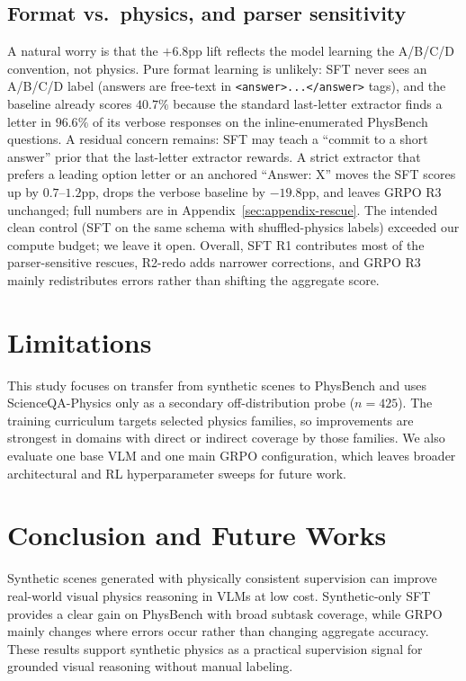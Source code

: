 \documentclass{article}
\begin{document}
\subsection{Format vs.\ physics, and parser sensitivity}
\label{sec:rescue}

A natural worry is that the $+6.8$pp lift reflects the model
learning the A/B/C/D convention, not physics. Pure format learning
is unlikely: SFT never sees an A/B/C/D label (answers are free-text
in \texttt{<answer>...</answer>} tags), and the baseline already
scores $40.7\%$ because the standard last-letter extractor finds a
letter in $96.6\%$ of its verbose responses on the inline-enumerated
PhysBench questions. A residual concern remains: SFT may teach a
``commit to a short answer'' prior that the last-letter extractor
rewards. A strict
extractor that prefers a leading option letter or an anchored
``Answer: X'' moves the SFT scores up by $0.7$--$1.2$pp, drops
the verbose baseline by $-19.8$pp, and leaves GRPO R3 unchanged;
full numbers are in Appendix~\ref{sec:appendix-rescue}. The
intended clean control (SFT on the same schema with
shuffled-physics labels) exceeded our compute budget; we leave
it open. Overall, SFT R1 contributes most of the parser-sensitive
rescues, R2-redo adds narrower corrections, and GRPO R3 mainly
redistributes errors rather than shifting the aggregate score.

\section{Limitations}
\label{sec:limitations}

This study focuses on transfer from synthetic scenes to PhysBench and
uses ScienceQA-Physics only as a secondary off-distribution probe
($n{=}425$). The training curriculum targets selected physics families,
so improvements are strongest in domains with direct or indirect
coverage by those families. We also evaluate one base VLM and one main
GRPO configuration, which leaves broader architectural and RL
hyperparameter sweeps for future work.

\section{Conclusion and Future Works}
\label{sec:conclusion}

Synthetic scenes generated with physically consistent supervision can
improve real-world visual physics reasoning in VLMs at low cost.
Synthetic-only SFT provides a clear gain on PhysBench with broad
subtask coverage, while GRPO mainly changes where errors occur rather
than changing aggregate accuracy. These results support synthetic
physics as a practical supervision signal for grounded visual reasoning
without manual labeling.
\end{document}
